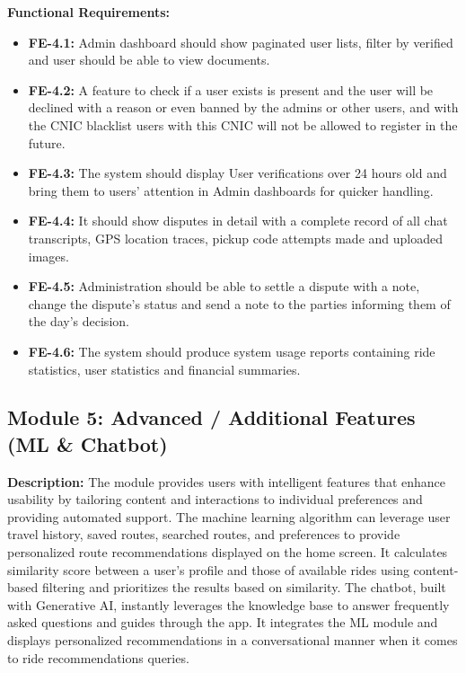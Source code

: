 \textbf{Functional Requirements:}

\begin{itemize}
    \item \textbf{FE-4.1:} Admin dashboard should show paginated user lists, filter by verified and user should be able to view documents.

    \item \textbf{FE-4.2:} A feature to check if a user exists is present and the user will be declined with a reason or even banned by the admins or other users, and with the CNIC blacklist users with this CNIC will not be allowed to register in the future.

    \item \textbf{FE-4.3:} The system should display User verifications over 24 hours old and bring them to users' attention in Admin dashboards for quicker handling.

    \item \textbf{FE-4.4:} It should show disputes in detail with a complete record of all chat transcripts, GPS location traces, pickup code attempts made and uploaded images.

    \item \textbf{FE-4.5:} Administration should be able to settle a dispute with a note, change the dispute's status and send a note to the parties informing them of the day's decision.

    \item \textbf{FE-4.6:} The system should produce system usage reports containing ride statistics, user statistics and financial summaries.
\end{itemize}

\subsection{Module 5: Advanced / Additional Features (ML \& Chatbot)}

\textbf{Description:} The module provides users with intelligent features that enhance usability by tailoring content and interactions to individual preferences and providing automated support. The machine learning algorithm can leverage user travel history, saved routes, searched routes, and preferences to provide personalized route recommendations displayed on the home screen. It calculates similarity score between a user's profile and those of available rides using content-based filtering and prioritizes the results based on similarity. The chatbot, built with Generative AI, instantly leverages the knowledge base to answer frequently asked questions and guides through the app. It integrates the ML module and displays personalized recommendations in a conversational manner when it comes to ride recommendations queries.


